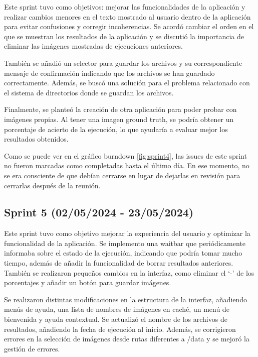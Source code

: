 Este sprint tuvo como objetivos: mejorar las funcionalidades de la aplicación y realizar cambios menores en el texto mostrado al usuario dentro de la aplicación para evitar confusiones y corregir incoherencias. Se acordó cambiar el orden en el que se muestran los resultados de la aplicación y se discutió la importancia de eliminar las imágenes mostradas de ejecuciones anteriores.

También se añadió un selector para guardar los archivos y su correspondiente mensaje de confirmación indicando que los archivos se han guardado correctamente. Además, se buscó una solución para el problema relacionado con el sistema de directorios donde se guardan los archivos.

Finalmente, se planteó la creación de otra aplicación para poder probar con imágenes propias. Al tener una imagen ground truth, se podría obtener un porcentaje de acierto de la ejecución, lo que ayudaría a evaluar mejor los resultados obtenidos.


Como se puede ver en el gráfico burndown \ref{fig:sprint4}, las issues de este sprint no fueron marcadas como completadas hasta el último día. En ese momento, no se era consciente de que debían cerrarse en lugar de dejarlas en revisión para cerrarlas después de la reunión.


\subsection{Sprint 5 (02/05/2024 - 23/05/2024)}\label{sprint-5}

Este sprint tuvo como objetivo mejorar la experiencia del usuario y optimizar la funcionalidad de la aplicación. Se implemento una waitbar que periódicamente informaba sobre el estado de la ejecución, indicando que podría tomar mucho tiempo, además de añadir la funcionalidad de borrar resultados anteriores. También se realizaron pequeños cambios en la interfaz, como eliminar el `-' de los porcentajes y añadir un botón para guardar imágenes.

Se realizaron distintas modificaciones en la estructura de la interfaz, añadiendo menús de ayuda, una lista de nombres de imágenes en caché, un menú de bienvenida y ayuda contextual. Se actualizó el nombre de los archivos de resultados, añadiendo la fecha de ejecución al inicio. Además, se corrigieron errores en la selección de imágenes desde rutas diferentes a /data y se mejoró la gestión de errores.

